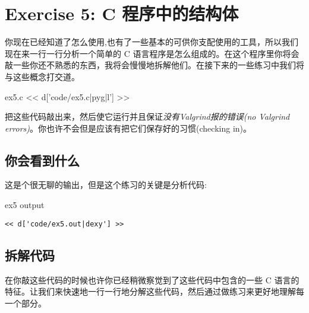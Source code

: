 \chapter{Exercise 5: C 程序中的结构体}

你现在已经知道了怎么使用,也有了一些基本的可供你支配使用的工具，所以我们现在来一行一行分析一个简单的 C 语言程序是怎么组成的。在这个程序里你将会敲一些你还不熟悉的东西，我将会慢慢地拆解他们。在接下来的一些练习中我们将与这些概念打交道。

\begin{code}{ex5.c}
<< d['code/ex5.c|pyg|l'] >>
\end{code}

把这些代码敲出来，然后使它运行并且保证\emph{没有Valgrind报的错误(no Valgrind errors)}。你也许不会但是应该有把它们保存好的习惯(checking in)。

\section{你会看到什么}

这是个很无聊的输出，但是这个练习的关键是分析代码:

\begin{code}{ex5 output}
\begin{lstlisting}
<< d['code/ex5.out|dexy'] >>
\end{lstlisting}
\end{code}

\section{拆解代码}

在你敲这些代码的时候也许你已经稍微察觉到了这些代码中包含的一些 C 语言的特征。让我们来快速地一行一行地分解这些代码，然后通过做练习来更好地理解每一个部分。

